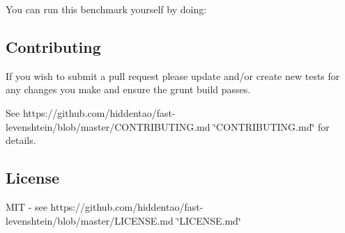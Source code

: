 You can run this benchmark yourself by doing\+:




\subsection*{Contributing}

If you wish to submit a pull request please update and/or create new tests for any changes you make and ensure the grunt build passes.

See https\+://github.com/hiddentao/fast-\/levenshtein/blob/master/\+C\+O\+N\+T\+R\+I\+B\+U\+T\+I\+N\+G.\+md \char`\"{}\+C\+O\+N\+T\+R\+I\+B\+U\+T\+I\+N\+G.\+md\char`\"{} for details.

\subsection*{License}

M\+IT -\/ see https\+://github.com/hiddentao/fast-\/levenshtein/blob/master/\+L\+I\+C\+E\+N\+S\+E.\+md \char`\"{}\+L\+I\+C\+E\+N\+S\+E.\+md\char`\"{} 